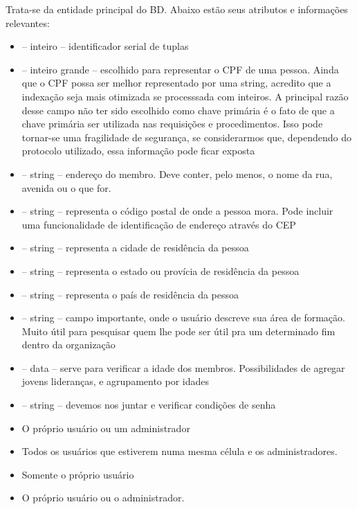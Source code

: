 \documentclass[11pt]{article}
\begin{document}
            Trata-se da entidade principal do BD. Abaixo estão seus atributos e informações
            relevantes:
            \begin{itemize}
                \item \cp {} -- inteiro -- identificador serial de tuplas
                \item {} -- inteiro grande -- escolhido para representar o CPF
                de uma pessoa. Ainda que o CPF possa ser melhor representado por uma string,
                acredito que a indexação seja mais otimizada se processsada com inteiros.
                A principal razão desse campo não ter sido escolhido como chave primária
                é o fato de que a chave primária ser utilizada nas requisições e procedimentos.
                Isso pode tornar-se uma fragilidade de segurança, se considerarmos que, dependendo
                do protocolo utilizado, essa informação pode ficar exposta
                \item {} -- string -- endereço do membro. Deve conter, pelo
                menos, o nome da rua, avenida ou o que for.
                \item {} -- string -- representa o código postal de onde a pessoa
                mora. Pode incluir uma funcionalidade de identificação de endereço através do CEP
                \item {} -- string -- representa a cidade de residência da pessoa
                \item {} -- string -- representa o estado ou provícia de residência
                da pessoa
                \item {} -- string -- representa o país de residência da pessoa
                \item {} -- string -- campo importante, onde o usuário
                descreve sua área de formação. Muito útil para pesquisar quem lhe pode ser
                útil pra um determinado fim dentro da organização
                \item {} -- data -- serve para verificar a idade dos membros.
                Possibilidades de agregar jovens lideranças, e agrupamento por idades
                \item {} -- string -- devemos nos juntar e verificar condições de senha
                \item \criar O próprio usuário ou um administrador
                \item \ler Todos os usuários que estiverem numa mesma
                célula e os administradores.
                \item \atualizar Somente o próprio usuário
                \item \deletar O próprio usuário ou o administrador.
            \end{itemize}
\end{document}
